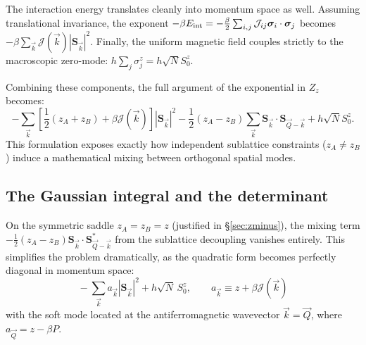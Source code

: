 \documentclass[11pt,a4paper]{article}
\newcommand{\Jc}{\mathcal{J}}
\newcommand{\bk}{\vec k}
\newcommand{\bQ}{\vec Q}
\newcommand{\Jc}{\mathcal{J}}
\newcommand{\bk}{\vec k}
\newcommand{\bQ}{\vec Q}
\begin{document}
The interaction energy translates cleanly into momentum space as well. Assuming translational invariance, the exponent $-\beta E_{\rm int} = -\frac{\beta}{2}\sum_{i,j} \Jc_{ij} \bm{\sigma}_i \cdot \bm{\sigma}_j$ becomes $-\beta \sum_{\bk} \Jc(\bk) |\bm{S}_{\bk}|^2$. 
Finally, the uniform magnetic field couples strictly to the macroscopic zero-mode: $h \sum_j \sigma_j^z = h \sqrt{N} S_0^z$.

Combining these components, the full argument of the exponential in $Z_z$ becomes:
\begin{equation}
  -\sum_{\bk} \left[ \frac{1}{2}(z_A + z_B) + \beta \Jc(\bk) \right] |\bm{S}_{\bk}|^2 - \frac{1}{2}(z_A - z_B) \sum_{\bk} \bm{S}_{\bk} \cdot \bm{S}_{\bQ-\bk} + h \sqrt{N} S_0^z.
  \label{eq:fullexponent}
\end{equation}
This formulation exposes exactly how independent sublattice constraints ($z_A \neq z_B$) induce a mathematical mixing between orthogonal spatial modes.



\subsection{The Gaussian integral and the determinant}
On the symmetric saddle $z_A = z_B = z$ (justified in \S\ref{sec:zminus}), the mixing term $-\tfrac12(z_A-z_B)\bm{S}_{\bk}\cdot\bm{S}^*_{\bQ-\bk}$ from the sublattice decoupling vanishes entirely. This simplifies the problem dramatically, as the quadratic form becomes perfectly diagonal in momentum space:
\begin{equation}
  \boxed{\ -\sum_{\bk}a_{\bk}|\bm S_{\bk}|^2+h\sqrt N\,S^z_0,
   \qquad a_{\bk}\equiv z+\beta\Jc(\bk)\ }
  \label{eq:quadform}
\end{equation}
with the soft mode located at the antiferromagnetic wavevector $\bk=\bQ$, where $a_{\bQ}=z-\beta P$. 
\end{document}
